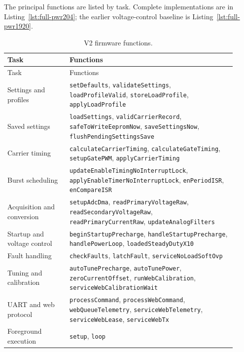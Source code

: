 The principal functions are listed by task. Complete implementations are in Listing~\ref{lst:full-pwr204}; the earlier voltage-control baseline is Listing~\ref{lst:full-pwr1920}.
\begingroup
\small
\begin{longtable}{@{}L{0.25\linewidth}L{0.67\linewidth}@{}}
\caption{V2 firmware functions.}\label{tab:app-fw-function-map}\\
\toprule Task & Functions\\\midrule
\endfirsthead
\toprule Task & Functions\\\midrule
\endhead
Settings and profiles & \nolinkurl{setDefaults}, \nolinkurl{validateSettings}, \nolinkurl{loadProfileValid}, \nolinkurl{storeLoadProfile}, \nolinkurl{applyLoadProfile}\\
Saved settings & \nolinkurl{loadSettings}, \nolinkurl{validCarrierRecord}, \nolinkurl{safeToWriteEepromNow}, \nolinkurl{saveSettingsNow}, \nolinkurl{flushPendingSettingsSave}\\
Carrier timing & \nolinkurl{calculateCarrierTiming}, \nolinkurl{calculateGateTiming}, \nolinkurl{setupGatePWM}, \nolinkurl{applyCarrierTiming}\\
Burst scheduling & \nolinkurl{updateEnableTimingNoInterruptLock}, \nolinkurl{applyEnableTimerNoInterruptLock}, \nolinkurl{enPeriodISR}, \nolinkurl{enCompareISR}\\
Acquisition and conversion & \nolinkurl{setupAdcDma}, \nolinkurl{readPrimaryVoltageRaw}, \nolinkurl{readSecondaryVoltageRaw}, \nolinkurl{readPrimaryCurrentRaw}, \nolinkurl{updateAnalogFilters}\\
Startup and voltage control & \nolinkurl{beginStartupPrecharge}, \nolinkurl{handleStartupPrecharge}, \nolinkurl{handlePowerLoop}, \nolinkurl{loadedSteadyDutyX10}\\
Fault handling & \nolinkurl{checkFaults}, \nolinkurl{latchFault}, \nolinkurl{serviceNoLoadSoftOvp}\\
Tuning and calibration & \nolinkurl{autoTunePrecharge}, \nolinkurl{autoTunePower}, \nolinkurl{zeroCurrentOffset}, \nolinkurl{runWebCalibration}, \nolinkurl{serviceWebCalibrationWait}\\
UART and web protocol & \nolinkurl{processCommand}, \nolinkurl{processWebCommand}, \nolinkurl{webQueueTelemetry}, \nolinkurl{serviceWebTelemetry}, \nolinkurl{serviceWebLease}, \nolinkurl{serviceWebTx}\\
Foreground execution & \nolinkurl{setup}, \nolinkurl{loop}\\
\bottomrule
\end{longtable}
\endgroup

